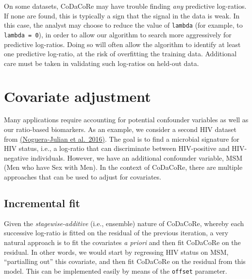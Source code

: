 \documentclass[
]{article}
\begin{document}
On some datasets, CoDaCoRe may have trouble finding \emph{any}
predictive log-ratios. If none are found, this is typically a sign that
the signal in the data is weak. In this case, the analyst may choose to
reduce the value of \texttt{lambda} (for example, to
\texttt{lambda\ =\ 0}), in order to allow our algorithm to search more
aggressively for predictive log-ratios. Doing so will often allow the
algorithm to identify at least one predictive log-ratio, at the risk of
overfitting the training data. Additional care must be taken in
validating such log-ratios on held-out data.

\hypertarget{covariate-adjustment}{%
\section{Covariate adjustment}\label{covariate-adjustment}}

Many applications require accounting for potential confounder variables
as well as our ratio-based biomarkers. As an example, we consider a
second HIV dataset from
\href{http://dx.doi.org/10.1016/j.ebiom.2016.01.032}{(Noguera-Julian et
al.~2016)}. The goal is to find a microbial signature for HIV status,
i.e., a log-ratio that can discriminate between HIV-positive and
HIV-negative individuals. However, we have an additional confounder
variable, MSM (Men who have Sex with Men). In the context of CoDaCoRe,
there are multiple approaches that can be used to adjust for covariates.

\hypertarget{incremental-fit}{%
\subsection{Incremental fit}\label{incremental-fit}}

Given the \emph{stagewise-additive} (i.e., ensemble) nature of CoDaCoRe,
whereby each successive log-ratio is fitted on the residual of the
previous iteration, a very natural approach is to fit the covariates
\emph{a priori} and then fit CoDaCoRe on the residual. In other words,
we would start by regressing HIV status on MSM, ``partialling out'' this
covariate, and then fit CoDaCoRe on the residual from this model. This
can be implemented easily by means of the \texttt{offset} parameter.
\end{document}
